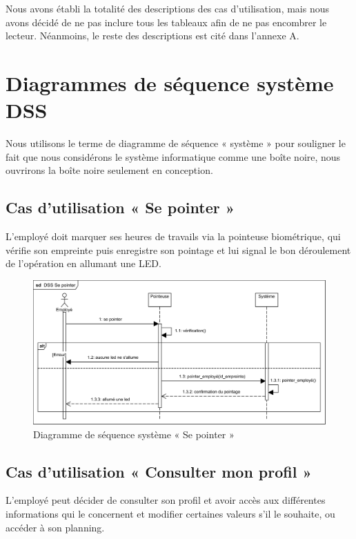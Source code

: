             
Nous avons établi la totalité des descriptions des cas d’utilisation, mais nous
avons décidé de ne pas inclure tous les tableaux afin de ne pas encombrer le
lecteur. Néanmoins, le reste des descriptions est cité dans l’annexe A.  
    
                
\section{Diagrammes de séquence système DSS}
Nous utilisons le terme de diagramme de séquence « système » pour souligner le
fait que nous considérons le système informatique comme une boîte noire, nous
ouvrirons la boîte noire seulement en conception.\cite{5}
    
\subsection{Cas d'utilisation « Se pointer »}
L’employé doit marquer ses heures de travails via la pointeuse biométrique, qui
vérifie son empreinte puis enregistre son pointage et lui signal le bon
déroulement de l’opération en allumant une LED.

    \begin{figure}[h!]
         \centering
        \includegraphics[scale=0.9]{images/DSS/DSS Se pointer.png}
         \caption{Diagramme de séquence système « Se pointer »}
         \label{fig4}
    \end{figure}
\vspace{-30pt}
\clearpage
\subsection{Cas d'utilisation « Consulter mon profil »}
L’employé peut décider de consulter son profil et avoir accès aux différentes
informations qui le concernent et modifier certaines valeurs s’il le souhaite, 
ou accéder à son planning. 
 
